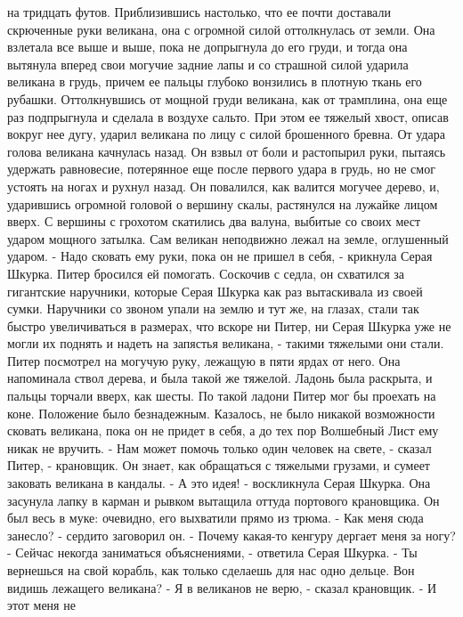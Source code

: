 на тридцать футов. Приблизившись настолько, что ее почти доставали 
скрюченные руки великана, она с огромной силой оттолкнулась от земли. 
Она взлетала все выше и выше, пока не допрыгнула до его груди, и тогда 
она вытянула вперед свои могучие задние лапы и со страшной силой 
ударила великана в грудь, причем ее пальцы глубоко вонзились в плотную 
ткань его рубашки. Оттолкнувшись от мощной груди великана, как от 
трамплина, она еще раз подпрыгнула и сделала в воздухе сальто. При 
этом ее тяжелый хвост, описав вокруг нее дугу, ударил великана по лицу 
с силой брошенного бревна.
    От удара голова великана качнулась назад. Он взвыл от боли и 
растопырил руки, пытаясь удержать равновесие, потерянное еще после 
первого удара в грудь, но не смог устоять на ногах и рухнул назад. Он 
повалился, как валится могучее дерево, и, ударившись огромной головой 
о вершину скалы, растянулся на лужайке лицом вверх. С вершины с 
грохотом скатились два валуна, выбитые со своих мест ударом мощного 
затылка. Сам великан неподвижно лежал на земле, оглушенный ударом.
    - Надо сковать ему руки, пока он не пришел в себя, - крикнула 
Серая Шкурка.
    Питер бросился ей помогать. Соскочив с седла, он схватился за 
гигантские наручники, которые Серая Шкурка как раз вытаскивала из 
своей сумки. Наручники со звоном упали на землю и тут же, на глазах, 
стали так быстро увеличиваться в размерах, что вскоре ни Питер, ни 
Серая Шкурка уже не могли их поднять и надеть на запястья великана, - 
такими тяжелыми они стали.
    Питер посмотрел на могучую руку, лежащую в пяти ярдах от него. Она 
напоминала ствол дерева, и была такой же тяжелой. Ладонь была 
раскрыта, и пальцы торчали вверх, как шесты. По такой ладони Питер мог 
бы проехать на коне.
    Положение было безнадежным. Казалось, не было никакой возможности 
сковать великана, пока он не придет в себя, а до тех пор Волшебный 
Лист ему никак не вручить.
    - Нам может помочь только один человек на свете, - сказал Питер, - 
крановщик. Он знает, как обращаться с тяжелыми грузами, и сумеет 
заковать великана в кандалы.
    - А это идея! - воскликнула Серая Шкурка. Она засунула лапку в 
карман и рывком вытащила оттуда портового крановщика. Он был весь в 
муке: очевидно, его выхватили прямо из трюма.
    - Как меня сюда занесло? - сердито заговорил он. - Почему какая-то 
кенгуру дергает меня за ногу?
    - Сейчас некогда заниматься объяснениями, - ответила Серая Шкурка. 
- Ты вернешься на свой корабль, как только сделаешь для нас одно 
дельце. Вон видишь лежащего великана?
    - Я в великанов не верю, - сказал крановщик. - И этот меня не 
